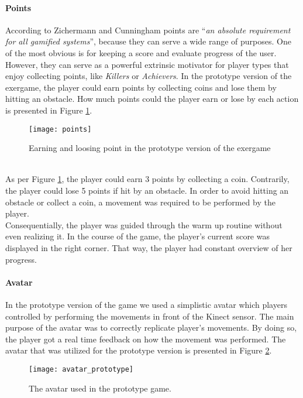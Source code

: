 \paragraph{Points}
According to Zichermann and Cunningham \cite{zichermann2011gamification} points are ``\textit{an absolute requirement for all gamified systems}'', because they can serve a wide range of purposes. One of the most obvious is for keeping a score and evaluate progress of the user. However, they can serve as a powerful extrinsic motivator for player types that enjoy collecting points, like \textit{Killers} or \textit{Achievers}. In the prototype version of the exergame, the player could earn points by collecting coins and lose them by hitting an obstacle. How much points could the player earn or lose by each action is presented in Figure \ref{fig:points}.\\
\begin{figure}[h]
    \centering
    \texttt{[image: points]}
    \caption{Earning and loosing point in the prototype version of the exergame}
    \label{fig:points}
\end{figure}\\
As per Figure \ref{fig:points}, the player could earn 3 points by collecting a coin. Contrarily, the player could lose 5 points if hit by an obstacle. In order to avoid hitting an obstacle or collect a coin, a movement was required to be performed by the player.\\ Consequentially, the player was guided through the warm up routine without even realizing it. In the course of the game, the player's current score was displayed in the right corner. That way, the player had constant overview of her progress.  
\paragraph{Avatar}
In the prototype version of the game we used a simplistic avatar which players controlled by performing the movements in front of the Kinect sensor. The main purpose of the avatar was to correctly replicate player's movements. By doing so, the player got a real time feedback on how the movement was performed. The avatar that was utilized for the prototype version is presented in Figure \ref{fig:avatar_prototype}.\\
\begin{figure}[h]
    \centering
    \texttt{[image: avatar\_prototype]}
    \caption{The avatar used in the prototype game.}
    \label{fig:avatar_prototype}
\end{figure}
\pagebreak
